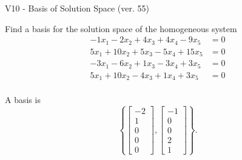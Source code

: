 \begin{exercise}
  \begin{exerciseTitle}V10 - Basis of Solution Space (ver. 55)\end{exerciseTitle}
  \begin{exerciseStatement}
    Find a basis for the solution space of the homogeneous system 
\begin{align*}
 -1 x_ 1 -2 x_ 2 + 4 x_ 3 + 4 x_ 4 -9 x_ 5 &= 0  \\ 
  5 x_ 1 + 10 x_ 2 + 5 x_ 3 -5 x_ 4 + 15 x_ 5 &= 0  \\ 
  -3 x_ 1 -6 x_ 2 + 1 x_ 3 -3 x_ 4 + 3 x_ 5 &= 0  \\ 
  5 x_ 1 + 10 x_ 2 -4 x_ 3 + 1 x_ 4 + 3 x_ 5 &= 0  \\ 
 \end{align*}


 
  \end{exerciseStatement}

  \begin{exerciseAnswer}
   A basis is   
\[\left\{\left[\begin{array}{c}
-2 \\
1 \\
0 \\
0 \\
0
\end{array}\right] , \left[\begin{array}{c}
-1 \\
0 \\
0 \\
2 \\
1
\end{array}\right]\right\}.\]

  


  \end{exerciseAnswer}
\end{exercise}